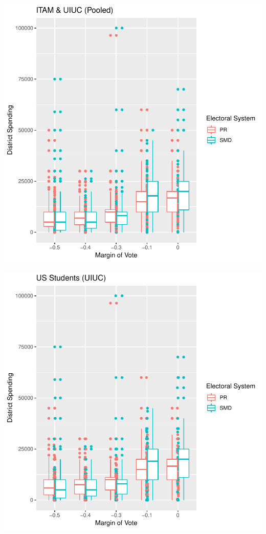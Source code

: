 \documentclass{article}
\begin{document}




\includegraphics{MPSA_figures-001}

\includegraphics{MPSA_figures-002}
\end{document}
